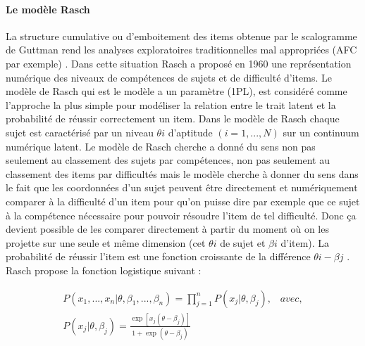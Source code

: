 \paragraph{Le modèle Rasch}
La structure cumulative ou d’emboitement des items obtenue par le scalogramme de Guttman rend les analyses exploratoires traditionnelles mal appropriées (AFC par exemple) . Dans cette situation Rasch a proposé en 1960 une représentation numérique des niveaux de compétences de sujets et de difficulté d’items. Le modèle de Rasch qui est le modèle a un paramètre (1PL), est considéré comme l’approche la plus simple pour modéliser la relation entre le trait latent et la probabilité de réussir correctement un item. Dans le modèle de Rasch chaque sujet est caractérisé par un niveau \(\displaystyle \theta i \) d’aptitude \(\displaystyle (i=1,...,N) \) sur un continuum numérique latent.
Le modèle de Rasch cherche a donné du sens non pas seulement au classement des sujets par compétences, non pas seulement au classement des items par difficultés mais le modèle cherche à donner du sens dans le fait que les coordonnées d’un sujet peuvent être directement et numériquement comparer à la difficulté d’un item pour qu’on puisse dire par exemple que ce sujet à la compétence nécessaire pour pouvoir résoudre l’item de tel difficulté. Donc ça devient possible de les comparer directement à partir du moment où on les projette sur une seule et même dimension (cet \(\displaystyle \theta i \) de sujet et \(\displaystyle \beta i \) d’item). La probabilité de réussir l’item est une fonction croissante de la différence \(\displaystyle \theta i - \beta j\) \cite{yvonnick_2019}.
Rasch propose la fonction logistique suivant \cite{mislevy1994evidence}:

\begin{equation}
    \begin{split}
		P(x_{1},...,x_{n} | \theta, \beta_{1},...,\beta_{n}) = \prod_{j=1}^{n} P(x_{j}| \theta, \beta_{j}), \hspace{10pt} avec, \\
		P(x_{j}| \theta, \beta_{j}) = \frac{\exp \left[x_{j}(\theta - \beta_{j})\right]  }{1+ \exp (\theta - \beta_{j})}
	\end{split}
	\label{posterior_probability_distribution}
\end{equation}

